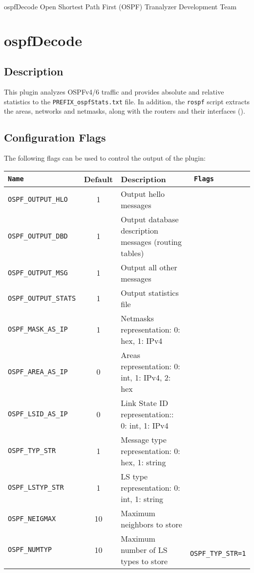 \documentclass[documentation]{subfiles}
\begin{document}
\trantitle
    {ospfDecode}
    {Open Shortest Path First (OSPF)}
    {Tranalyzer Development Team}

\section{ospfDecode}\label{s:ospfDecode}

\subsection{Description}
This plugin analyzes OSPFv4/6 traffic and provides absolute and relative statistics to the {\tt PREFIX\_ospfStats.txt} file. In addition, the {\tt rospf} script extracts the areas, networks and netmasks, along with the routers and their interfaces ().

\subsection{Configuration Flags}\label{s:ospf-of}
The following flags can be used to control the output of the plugin:
\begin{longtable}{>{\tt}lcl>{\tt\small}l}
    \toprule
    {\bf Name}          & {\bf Default} & {\bf Description}                                     & {\bf Flags}\\
    \midrule\endhead%
    OSPF\_OUTPUT\_HLO   &  1            & Output hello messages                                 & \\
    OSPF\_OUTPUT\_DBD   &  1            & Output database description messages (routing tables) & \\
    OSPF\_OUTPUT\_MSG   &  1            & Output all other messages                             & \\
    OSPF\_OUTPUT\_STATS &  1            & Output statistics file                                & \\
    OSPF\_MASK\_AS\_IP  &  1            & Netmasks representation: 0: hex, 1: IPv4              & \\
    OSPF\_AREA\_AS\_IP  &  0            & Areas representation: 0: int, 1: IPv4, 2: hex         & \\
    OSPF\_LSID\_AS\_IP  &  0            & Link State ID representation:: 0: int, 1: IPv4        & \\
    OSPF\_TYP\_STR      &  1            & Message type representation: 0: hex, 1: string        & \\
    OSPF\_LSTYP\_STR    &  1            & LS type representation: 0: int, 1: string             & \\
    OSPF\_NEIGMAX       & 10            & Maximum neighbors to store                            & \\
    OSPF\_NUMTYP        & 10            & Maximum number of LS types to store                   & OSPF\_TYP\_STR=1\\
    \bottomrule
\end{longtable}
\end{document}
